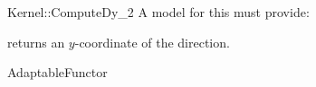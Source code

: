 \begin{ccRefFunctionObjectConcept}{Kernel::ComputeDy_2}
A model for this must provide:



       {returns an $y$-coordinate of the direction.}

\ccRefines
AdaptableFunctor



\end{ccRefFunctionObjectConcept}
